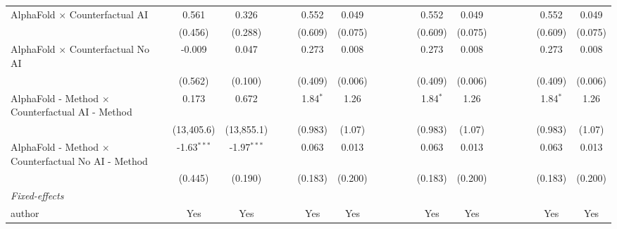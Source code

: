 \begin{tabular}{lcccccccccccccccccc}
   AlphaFold $\times$ Counterfactual AI                       & 0.561         & 0.326         &     &     & 0.552        & 0.049          &       &       &     &      & 0.552        & 0.049          &       &       &      &      & 0.552        & 0.049\\   
                                                              & (0.456)       & (0.288)       &     &     & (0.609)      & (0.075)        &       &       &     &      & (0.609)      & (0.075)        &       &       &      &      & (0.609)      & (0.075)\\   
   AlphaFold $\times$ Counterfactual No AI                    & -0.009        & 0.047         &     &     & 0.273        & 0.008          &       &       &     &      & 0.273        & 0.008          &       &       &      &      & 0.273        & 0.008\\   
                                                              & (0.562)       & (0.100)       &     &     & (0.409)      & (0.006)        &       &       &     &      & (0.409)      & (0.006)        &       &       &      &      & (0.409)      & (0.006)\\   
   AlphaFold - Method $\times$ Counterfactual AI - Method     & 0.173         & 0.672         &     &     & 1.84$^{*}$   & 1.26           &       &       &     &      & 1.84$^{*}$   & 1.26           &       &       &      &      & 1.84$^{*}$   & 1.26\\   
                                                              & (13,405.6)    & (13,855.1)    &     &     & (0.983)      & (1.07)         &       &       &     &      & (0.983)      & (1.07)         &       &       &      &      & (0.983)      & (1.07)\\   
   AlphaFold - Method $\times$ Counterfactual No AI - Method  & -1.63$^{***}$ & -1.97$^{***}$ &     &     & 0.063        & 0.013          &       &       &     &      & 0.063        & 0.013          &       &       &      &      & 0.063        & 0.013\\   
                                                              & (0.445)       & (0.190)       &     &     & (0.183)      & (0.200)        &       &       &     &      & (0.183)      & (0.200)        &       &       &      &      & (0.183)      & (0.200)\\   
   \midrule
   \emph{Fixed-effects}\\
   author                                                     & Yes           & Yes           &     &     & Yes          & Yes            &       &       &     &      & Yes          & Yes            &       &       &      &      & Yes          & Yes\\  

\end{tabular}
